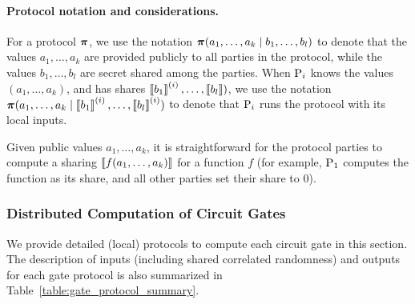 \paragraph{Protocol notation and considerations.}
For a protocol $\boldsymbol{\pi}$, we use the notation $\boldsymbol{\pi}(a_1, \dots, a_k \mid b_1, \dots, b_l)$ to denote that the values $a_1, \dots, a_k$ are provided publicly to all parties in the protocol, while the values $b_1, \dots, b_l$ are secret shared among the parties. When $\textnormal{P}_i$ knows the values $(a_1, \dots, a_k)$, and has shares $\left\llbracket b_1 \right\rrbracket^{(i)}, \dots, \left\llbracket b_l \right\rrbracket)$, we use the notation $\boldsymbol{\pi}(a_1, \dots, a_k \mid \left\llbracket b_1 \right\rrbracket^{(i)}, \dots, \left\llbracket b_l \right\rrbracket^{(i)})$ to denote that $\textnormal{P}_i$ runs the protocol with its local inputs. 

Given public values $a_1, \dots, a_k$, it is straightforward for the protocol parties to compute a sharing $\left\llbracket f(a_1, \dots, a_k) \right\rrbracket$ for a function $f$ (for example, $\textnormal{P}_1$ computes the function as its share, and all other parties set their share to $0$).

\subsubsection{Distributed Computation of Circuit Gates}


We provide detailed (local) protocols to compute each circuit gate in this section. The description of inputs (including shared correlated randomness) and outputs for each gate protocol is also summarized in Table~\ref{table:gate_protocol_summary}.

